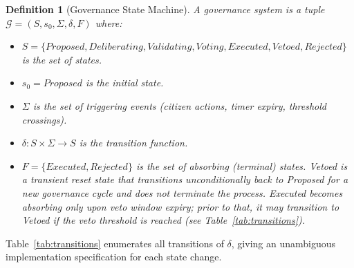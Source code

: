 \documentclass[12pt,a4paper,oneside]{report}
\newtheorem{definition}{Definition}[chapter]
\begin{document}
\begin{definition}[Governance State Machine]
A governance system is a tuple $\mathcal{G} = (S, s_0, \Sigma, \delta, F)$ where:
\begin{itemize}
  \item $S = \{\textit{Proposed}, \textit{Deliberating}, \textit{Validating}, \textit{Voting}, \textit{Executed}, \textit{Vetoed}, \textit{Rejected}\}$ is the set of states.
  \item $s_0 = \textit{Proposed}$ is the initial state.
  \item $\Sigma$ is the set of triggering events (citizen actions, timer expiry, threshold crossings).
  \item $\delta: S \times \Sigma \to S$ is the transition function.
  \item $F = \{\textit{Executed}, \textit{Rejected}\}$ is the set of absorbing (terminal) states. \textit{Vetoed} is a transient reset state that transitions unconditionally back to \textit{Proposed} for a new governance cycle and does not terminate the process. \textit{Executed} becomes absorbing only upon veto window expiry; prior to that, it may transition to \textit{Vetoed} if the veto threshold is reached (see Table~\ref{tab:transitions}).
\end{itemize}
\end{definition}

Table~\ref{tab:transitions} enumerates all transitions of $\delta$, giving an unambiguous implementation specification for each state change.
\end{document}
